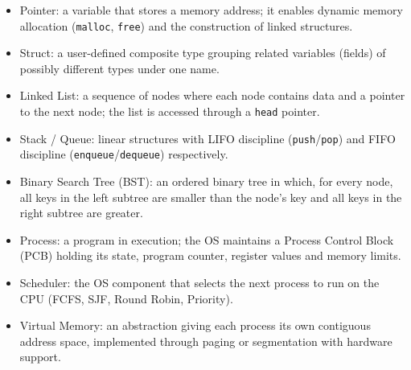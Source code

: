 \documentclass[11pt]{article}
\newcommand{\cle}[1]{{\popxbold\color{popdark}#1}}
\begin{document}
\begin{aretenir}
\begin{itemize}
\item \cle{Pointer}: a variable that stores a memory address; it enables dynamic memory allocation (\texttt{malloc}, \texttt{free}) and the construction of linked structures.
\item \cle{Struct}: a user-defined composite type grouping related variables (fields) of possibly different types under one name.
\item \cle{Linked List}: a sequence of nodes where each node contains data and a pointer to the next node; the list is accessed through a \texttt{head} pointer.
\item \cle{Stack / Queue}: linear structures with LIFO discipline (\texttt{push}/\texttt{pop}) and FIFO discipline (\texttt{enqueue}/\texttt{dequeue}) respectively.
\item \cle{Binary Search Tree (BST)}: an ordered binary tree in which, for every node, all keys in the left subtree are smaller than the node's key and all keys in the right subtree are greater.
\item \cle{Process}: a program in execution; the OS maintains a Process Control Block (PCB) holding its state, program counter, register values and memory limits.
\item \cle{Scheduler}: the OS component that selects the next process to run on the CPU (FCFS, SJF, Round Robin, Priority).
\item \cle{Virtual Memory}: an abstraction giving each process its own contiguous address space, implemented through paging or segmentation with hardware support.
\end{itemize}
\end{aretenir}
\end{document}
